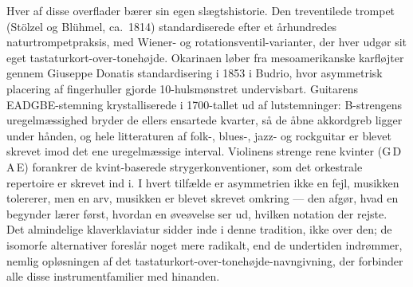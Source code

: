 \documentclass[10pt,letterpaper,twocolumn]{article}
\begin{document}
Hver af disse overflader bærer sin egen slægtshistorie. Den treventilede trompet (Stölzel og Blühmel, ca.\ 1814) standardiserede efter et århundredes naturtrompetpraksis, med Wiener- og rotationsventil-varianter, der hver udgør sit eget tastaturkort-over-tonehøjde. Okarinaen løber fra mesoamerikanske karfløjter gennem Giuseppe Donatis standardisering i 1853 i Budrio, hvor asymmetrisk placering af fingerhuller gjorde 10-hulsmønstret undervisbart. Guitarens EADGBE-stemning krystalliserede i 1700-tallet ud af lutstemninger: B-strengens uregelmæssighed bryder de ellers ensartede kvarter, så de åbne akkordgreb ligger under hånden, og hele litteraturen af folk-, blues-, jazz- og rockguitar er blevet skrevet imod det ene uregelmæssige interval. Violinens strenge rene kvinter (G\,D\,A\,E) forankrer de kvint-baserede strygerkonventioner, som det orkestrale repertoire er skrevet ind i. I hvert tilfælde er asymmetrien ikke en fejl, musikken tolererer, men en arv, musikken er blevet skrevet omkring --- den afgør, hvad en begynder lærer først, hvordan en øveøvelse ser ud, hvilken notation der rejste. Det almindelige klaverklaviatur sidder inde i denne tradition, ikke over den; de isomorfe alternativer foreslår noget mere radikalt, end de undertiden indrømmer, nemlig opløsningen af det tastaturkort-over-tonehøjde-navngivning, der forbinder alle disse instrumentfamilier med hinanden.
\end{document}
